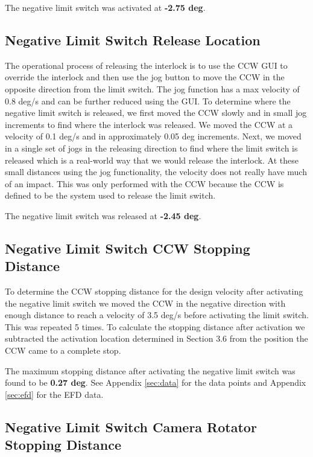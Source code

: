\documentclass[SE,authoryear,toc, lsstdraft]{lsstdoc}
\begin{document}
The negative limit switch was activated at \textbf{-2.75 deg}.

\subsection{Negative Limit Switch Release Location}

The operational process of releasing the interlock is to use the CCW GUI to override the interlock
and then use the jog button to move the CCW in the opposite direction from the limit switch.
The jog function has a max velocity of 0.8 deg/s and can be further reduced using the GUI.
To determine where the negative limit switch is released, we first moved
the CCW slowly and in small jog increments to find where the interlock was
released. We moved the CCW at a velocity of 0.1 deg/s and in approximately 0.05 deg
increments. Next, we moved in a single set of jogs in the releasing direction to find where the limit switch
is released which is a real-world way that we would release the interlock. At these small
distances using the jog functionality, the velocity does not really have much of an impact.
This was only performed with the CCW because the CCW is defined to be the system used to
release the limit switch.

The negative limit switch was released at \textbf{-2.45 deg}.

\subsection{Negative Limit Switch CCW Stopping Distance}

To determine the CCW stopping distance for the design velocity after
activating the negative limit switch we moved the CCW in the negative
direction with enough distance to reach a velocity of 3.5 deg/s before
activating the limit switch. This was repeated 5 times. To
calculate the stopping distance after activation we subtracted the
activation location determined in Section 3.6 from the position the CCW
came to a complete stop.

The maximum stopping distance after activating the negative limit switch
was found to be \textbf{0.27 deg}. See Appendix \ref{sec:data} for the data points
and Appendix \ref{sec:efd} for the EFD data.

\subsection{Negative Limit Switch Camera Rotator Stopping Distance}
\end{document}
